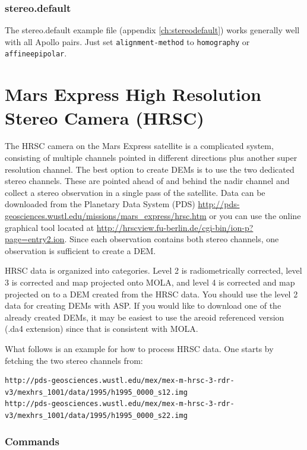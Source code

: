 \subsubsection*{stereo.default}

The stereo.default example file (appendix \ref{ch:stereodefault})
works generally well with all Apollo pairs. Just set
\texttt{alignment-method} to \texttt{homography} or
\texttt{affineepipolar}.



\section{Mars Express High Resolution Stereo Camera (HRSC)}

The HRSC camera on the Mars Express satellite is a complicated system,
consisting of multiple channels pointed in different directions plus
another super resolution channel.  The best option to create DEMs is to
use the two dedicated stereo channels.  These are pointed ahead of and
behind the nadir channel and collect a stereo observation in a single 
pass of the satellite.  Data can be downloaded from the Planetary Data
System (PDS) \url{http://pds-geosciences.wustl.edu/missions/mars_express/hrsc.htm}
or you can use the online graphical tool located at
\url{http://hrscview.fu-berlin.de/cgi-bin/ion-p?page=entry2.ion}.
Since each observation contains both stereo channels, one observation is sufficient 
to create a DEM.

HRSC data is organized into categories.  Level 2 is radiometrically corrected,
level 3 is corrected and map projected onto MOLA, and level 4 is corrected
and map projected on to a DEM created from the HRSC data.  You should use the
level 2 data for creating DEMs with ASP.  If you would like to download one
of the already created DEMs, it may be easiest to use the areoid referenced version
(.da4 extension) since that is consistent with MOLA.

What follows is an example for how to process HRSC data. One starts by fetching the two
stereo channels from:

\begin{verbatim}
http://pds-geosciences.wustl.edu/mex/mex-m-hrsc-3-rdr-v3/mexhrs_1001/data/1995/h1995_0000_s12.img
http://pds-geosciences.wustl.edu/mex/mex-m-hrsc-3-rdr-v3/mexhrs_1001/data/1995/h1995_0000_s22.img
\end{verbatim}

\subsubsection*{Commands}


